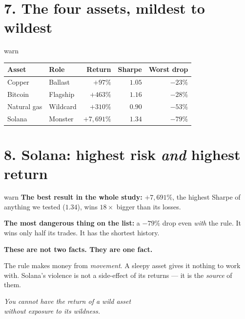 \documentclass[12pt,a4paper]{article}
\begin{document}
\section{7. The four assets, mildest to wildest}

\begin{kbox}{warn}
\centering
\begin{tabular}{@{}llrrr@{}}
    \toprule
    \textbf{Asset} & \textbf{Role} & \textbf{Return} & \textbf{Sharpe} & \textbf{Worst drop} \\
    \midrule
    Copper      & Ballast   & $+97\%$      & $1.05$ & $-23\%$ \\
    Bitcoin     & Flagship  & $+463\%$     & $1.16$ & $-28\%$ \\
    Natural gas & Wildcard  & $+310\%$     & $0.90$ & $-53\%$ \\
    Solana      & Monster   & $+7{,}691\%$ & $1.34$ & $-79\%$ \\
    \bottomrule
\end{tabular}

\end{kbox}

\section{8. Solana: highest risk \emph{and} highest return}

\begin{kbox}{warn}
\textbf{The best result in the whole study:} $+7{,}691\%$, the highest
Sharpe of anything we tested ($1.34$), wins $18\times$ bigger than its
losses.

\textbf{The most dangerous thing on the list:} a $-79\%$ drop even
\emph{with} the rule. It wins only half its trades. It has the shortest
history.

\vspace{0.6em}
\centering
\textbf{These are not two facts. They are one fact.}

\vspace{0.5em}
\raggedright
The rule makes money from \emph{movement}. A sleepy asset gives it
nothing to work with. Solana's violence is not a side-effect of its
returns --- it is the \emph{source} of them.

\vspace{0.5em}
\begin{center}
\itshape
You cannot have the return of a wild asset\\
without exposure to its wildness.
\end{center}

\end{kbox}
\end{document}
